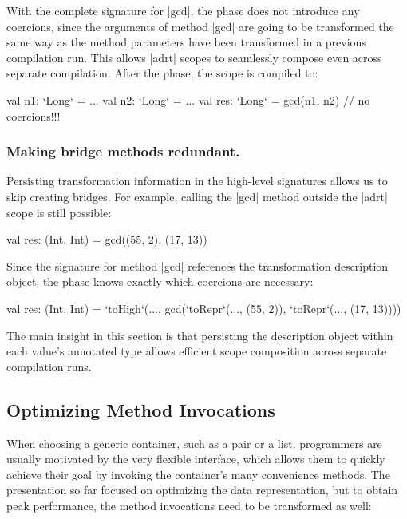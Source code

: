 With the complete signature for |gcd|, the \coerce{} phase does not introduce any coercions, since the arguments of method |gcd| are going to be transformed the same way as the method parameters have been transformed in a previous compilation run. This allows |adrt| scopes to seamlessly compose even across separate compilation. After the \commit{} phase, the scope is compiled to:

\begin{lstlisting-nobreak}
val n1: `Long` = ...
val n2: `Long` = ...
val res: `Long` = gcd(n1, n2) // no coercions!!!
\end{lstlisting-nobreak}

\subsubsection{Making bridge methods redundant.} Persisting transformation information in the high-level signatures allows us to skip creating bridges. For example, calling the |gcd| method outside the |adrt| scope is still possible:

\begin{lstlisting-nobreak}
val res: (Int, Int) = gcd((55, 2), (17, 13))
\end{lstlisting-nobreak}

Since the signature for method |gcd| references the transformation description object, the \coerce{} phase knows exactly which coercions are necessary:

\begin{lstlisting-nobreak}
val res: (Int, Int) = `toHigh`(...,
  gcd(`toRepr`(..., (55, 2)), `toRepr`(..., (17, 13))))
\end{lstlisting-nobreak}

The main insight in this section is that persisting the description object within each value's annotated type allows efficient scope composition across separate compilation runs.%


\subsection{Optimizing Method Invocations}
\label{sec:ildl:method}

When choosing a generic container, such as a pair or a list, programmers are usually motivated by the very flexible interface, which allows them to quickly achieve their goal by invoking the container's many convenience methods. The presentation so far focused on optimizing the data representation, but to obtain peak performance, the method invocations need to be transformed as well:

